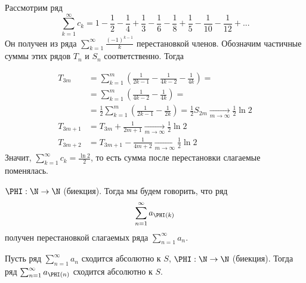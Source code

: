 \begin{Example}
	Рассмотрим ряд
	\[\sum_{k=1}^{\infty} c_k = 1 - \frac{1}{2} - \frac{1}{4} + \frac{1}{3} - \frac{1}{6} - \frac{1}{8} + \frac{1}{5} - \frac{1}{10} - \frac{1}{12} + ...\]
	Он получен из ряда $\sum_{k=1}^{\infty} \frac{(-1)^{k - 1}}{k}$ перестановкой членов. 
	Обозначим частичные суммы этих рядов $T_n$ и $S_n$ соответственно. Тогда

	\begin{align*}
		T_{3m} &= \sum_{k=1}^{m} \left(\frac{1}{2k - 1} - \frac{1}{4k - 2} - \frac{1}{4k}\right) = \\
		&= \sum_{k=1}^{m} \left(\frac{1}{4k - 2} - \frac{1}{4k}\right) = \\
		&= \frac{1}{2} \sum_{k=1}^{m} \left(\frac{1}{2k - 1} - \frac{1}{2k}\right) = \frac{1}{2} S_{2m} \xrightarrow[m \to \infty]{} \frac{1}{2} \ln 2 \\
		T_{3m + 1} &=  T_{3m} + \frac{1}{2m + 1} \xrightarrow[m \to \infty]{} \frac{1}{2} \ln 2 \\
		T_{3m + 2} &= T_{3m + 1} - \frac{1}{4m + 2} \xrightarrow[m \to \infty]{} \frac{1}{2} \ln 2
	\end{align*}
	Значит, $\sum_{k=1}^{\infty} c_k = \frac{\ln 2}{2}$, то есть сумма после перестановки слагаемые поменялась. 
\end{Example}

\begin{Def}
	$\PHI : \N \to \N$ (биекция). Тогда мы будем говорить, что ряд
	\[\sum_{n=1}^{\infty} a_{\PHI(k)}\] 
	получен перестановкой слагаемых ряда $\sum_{n=1}^{\infty} a_n$. 
\end{Def}

\begin{Thm}
	Пусть ряд $\sum_{n=1}^{\infty} a_n$ сходится абсолютно к $S$, $\PHI : \N \to \N$ (биекция). 
	Тогда ряд $\sum_{n=1}^{\infty} a_{\PHI(n)}$ сходится абсолютно к $S$.  
\end{Thm}

